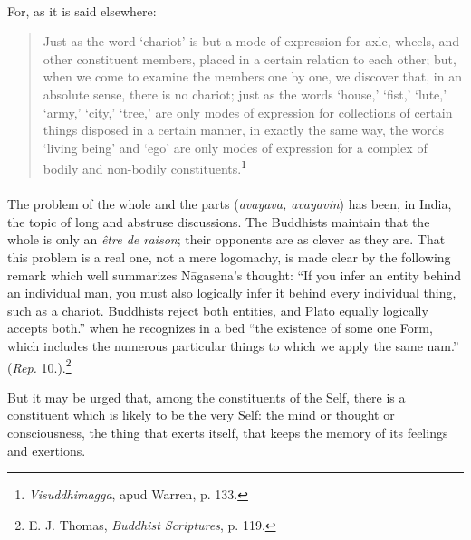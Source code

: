 \documentclass[a4paper, 11pt, oneside, english]{article}
\begin{document}
\paragraph{}
For, as it is said elsewhere:
\begin{quotation}
\small
Just as the word `chariot' is but a mode of expression for axle, wheels, and other constituent members, placed in a certain relation to each other; but, when we come to examine the members one by one, we discover that, in an absolute sense, there is no chariot; just as the words `house,' `fist,' `lute,' `army,' `city,' `tree,' are only modes of expression for collections of certain things disposed in a certain manner, in exactly the same way, the words `living being' and `ego' are only modes of expression for a complex of bodily and non-bodily constituents.\footnote{\emph{Visuddhimagga}, apud Warren, p. 133.}
\end{quotation}
\paragraph{}
The problem of the whole and the parts (\emph{avayava, avayavin}) has been, in India, the topic of long and abstruse discussions. The Buddhists maintain that the whole is only an \emph{être de raison}; their opponents are as clever as they are. That this problem is a real one, not a mere logomachy, is made clear by the following remark which well summarizes Nāgasena's thought: ``If you infer an entity behind an individual man, you must also logically infer it behind every individual thing, such as a chariot. Buddhists reject both entities, and Plato equally logically accepts both.'' when he recognizes in a bed ``the existence of some one Form, which includes the numerous particular things to which we apply the same nam.'' (\emph{Rep.} 10.).\footnote{E. J. Thomas, \emph{Buddhist Scriptures}, p. 119.}

But it may be urged that, among the constituents of the Self, there is a constituent which is likely to be the very Self: the mind or thought or consciousness, the thing that exerts itself, that keeps the memory of its feelings and exertions.
\end{document}
